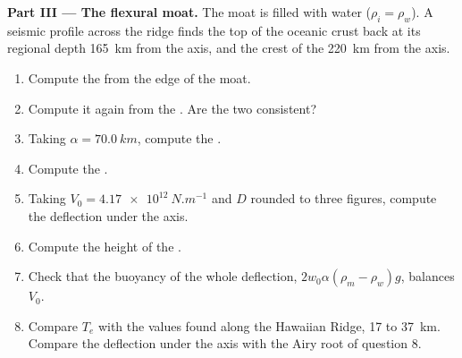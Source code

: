 \begin{problem}
\noindent\textbf{Part III --- The flexural moat.} The moat is filled with water
($\rho_i = \rho_w$). A seismic profile across the ridge finds the top of the
oceanic crust back at its regional depth \qty{165}{km} from the axis, and the
crest of the  \qty{220}{km} from the axis.
\begin{enumerate}[resume]
  \item Compute the  from the edge of the moat.
  \item Compute it again from the . Are the two consistent?
  \item Taking $\alpha = \qty{70.0}{km}$, compute the .
  \item Compute the .
  \item Taking $V_0 = \qty{4.17e12}{N.m^{-1}}$ and $D$ rounded to three
        figures, compute the deflection under the axis.
  \item Compute the height of the .
  \item Check that the buoyancy of the whole deflection, $2w_0\alpha(\rho_m -
        \rho_w)g$, balances $V_0$.
  \item Compare $T_e$ with the values found along the Hawaiian Ridge, 17 to
        \qty{37}{km}. Compare the deflection under the axis with the Airy
        root of question 8.
\end{enumerate}


\end{problem}

